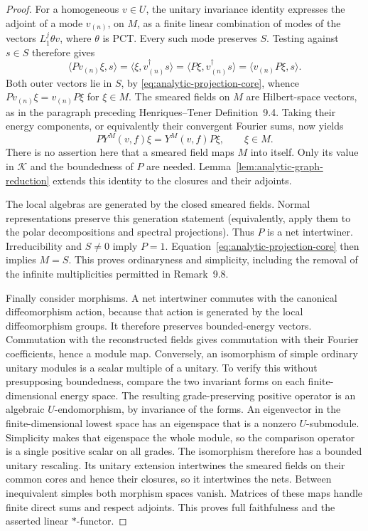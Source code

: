 \documentclass[11pt,a4paper]{article}
\theoremstyle{definition}
\begin{document}
\begin{proof}
For a homogeneous $v\in U$, the unitary invariance identity expresses
the adjoint of a mode $v_{(n)}$, on $M$, as a finite linear combination
of modes of the vectors $L_1^j\theta v$, where $\theta$ is PCT.
Every such mode preserves $S$.  Testing against $s\in S$ therefore
gives
\[
 \langle Pv_{(n)}\xi,s\rangle
 =\langle\xi,v_{(n)}^{\dagger}s\rangle
 =\langle P\xi,v_{(n)}^{\dagger}s\rangle
 =\langle v_{(n)}P\xi,s\rangle.
\]
Both outer vectors lie in $S$, by
\eqref{eq:analytic-projection-core}, whence
$Pv_{(n)}\xi=v_{(n)}P\xi$ for $\xi\in M$.
The smeared fields on $M$ are Hilbert-space vectors, as in the paragraph
preceding Henriques--Tener Definition~9.4.  Taking their energy
components, or equivalently their convergent Fourier sums, now yields
\[
 P Y^M(v,f)\xi=Y^M(v,f)P\xi,\qquad \xi\in M.
\]
There is no assertion here that a smeared field maps $M$ into itself.
Only its value in $\mathcal K$ and the boundedness of $P$ are needed.
Lemma~\ref{lem:analytic-graph-reduction} extends this identity to the
closures and their adjoints.

The local algebras are generated by the closed smeared fields.
Normal representations preserve this generation statement (equivalently,
apply them to the polar decompositions and spectral projections).
Thus $P$ is a net intertwiner.  Irreducibility and $S\ne0$ imply
$P=1$.  Equation~\eqref{eq:analytic-projection-core} then implies
$M=S$.  This proves ordinaryness and simplicity, including the removal
of the infinite multiplicities permitted in Remark~9.8.

Finally consider morphisms.  A net intertwiner commutes with the
canonical diffeomorphism action, because that action is generated by
the local diffeomorphism groups.  It therefore preserves bounded-energy
vectors.  Commutation with the reconstructed fields gives commutation
with their Fourier coefficients, hence a module map.  Conversely, an
isomorphism of simple ordinary unitary modules is a scalar multiple
of a unitary.  To verify this without presupposing boundedness, compare
the two invariant forms on each finite-dimensional energy space.  The
resulting grade-preserving positive operator is an algebraic
$U$-endomorphism, by invariance of the forms.  An eigenvector in the
finite-dimensional lowest space has an eigenspace that is a nonzero
$U$-submodule.  Simplicity makes that eigenspace the whole module, so
the comparison operator is a single positive scalar on all grades.
The isomorphism therefore has a bounded unitary rescaling.  Its
unitary extension intertwines the smeared fields on their common cores
and hence their closures, so it intertwines the nets.  Between
inequivalent simples both morphism spaces vanish.  Matrices of these
maps handle finite direct sums and respect adjoints.  This proves full
faithfulness and the asserted linear $*$-functor.
\end{proof}
\end{document}
